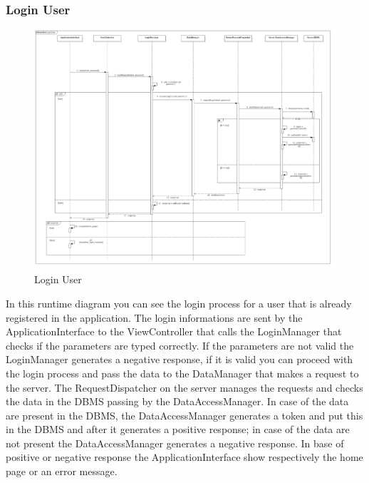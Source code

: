 \subsubsection{Login User}
\begin{figure}[!h]
\centering
\includegraphics[scale=0.25]{images/LoginUser}
\caption{Login User}
\end{figure}
In this runtime diagram you can see the login process for a user that is already registered in the application. The login informations are sent by the ApplicationInterface to the ViewController that calls the LoginManager that checks if the parameters are typed correctly. If the parameters are not valid the LoginManager generates a negative response, if it is valid you can proceed with the login process and pass the data to the DataManager that makes a request to the server. The RequestDispatcher on the server manages the requests and checks the data in the DBMS passing by the DataAccessManager. In case of the data are present in the DBMS, the DataAccessManager generates a token and put this in the DBMS and after it generates a positive response; in case of the data are not present the DataAccessManager generates a negative response. In base of positive or negative response the ApplicationInterface show respectively the home page or an error message.

